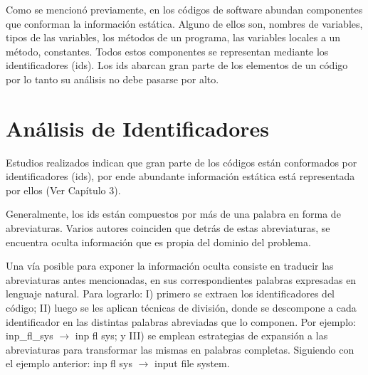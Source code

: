 Como se mencionó previamente, en los códigos de software abundan componentes que conforman la información estática. Alguno de ellos son, nombres de variables, tipos de las variables, los métodos de un programa, las variables locales a un método, constantes. Todos estos componentes se representan mediante los identificadores (ids). Los ids abarcan gran parte de los elementos de un código por lo tanto su análisis no debe pasarse por alto. 



\section{Análisis de Identificadores}

Estudios realizados \cite{DFPM05,DMDJ13,HDD06,FBL06} indican que gran parte de los códigos están conformados por identificadores (ids), por ende abundante información estática está representada por ellos (Ver Capítulo 3).

Generalmente, los ids están compuestos por más de una palabra en forma de abreviaturas. Varios autores coinciden \cite{BCPT99,LFBEX07,EZH08,EHPV09} que detrás de estas abreviaturas, se encuentra oculta información que es propia del dominio del problema.

\enlargethispage{\baselineskip}
\enlargethispage{\baselineskip}


Una vía posible para exponer la información oculta consiste en traducir las abreviaturas antes mencionadas, en sus correspondientes palabras expresadas en lenguaje natural.
Para lograrlo: I) primero se extraen los identificadores del código; II) luego se les aplican técnicas de división, donde se descompone a cada identificador en las distintas palabras abreviadas que lo componen. Por ejemplo: \textsf{inp\_fl\_sys} $\rightarrow$ \textsf{inp fl sys}; y III) se emplean estrategias de expansión a las abreviaturas para transformar las mismas en palabras completas. Siguiendo con el ejemplo anterior: \textsf{inp fl sys} $\rightarrow$ \textsf{input file system}.


